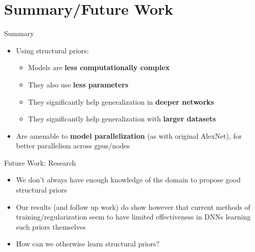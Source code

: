 \documentclass[t,xcolor=dvipsnames]{beamer}
\begin{document}
\usebackgroundtemplate{}

\section{Summary/Future Work}

\begin{frame}{Summary}

  \begin{itemize}
	\item Using structural priors:
	\begin{itemize}
    	\item Models are \textbf{less computationally complex}
	    \item They also use \textbf{less parameters}
	    \item They significantly help generalization in \textbf{deeper networks}
        \item They significantly help generalization with \textbf{larger datasets}
	\end{itemize}
	\item Are amenable to \textbf{model parallelization} (as with original AlexNet), for better parallelism across gpus/nodes
  \end{itemize}
\end{frame}

\begin{frame}{Future Work: Research}
    \begin{itemize}
        \item We don't always have enough knowledge of the domain to propose good structural priors
        \item Our results (and follow up work) do show however that current methods of training/regularization seem to have limited effectiveness in DNNs learning such priors themselves
        \item How can we otherwise learn structural priors?
    \end{itemize}
\end{frame}
\end{document}
